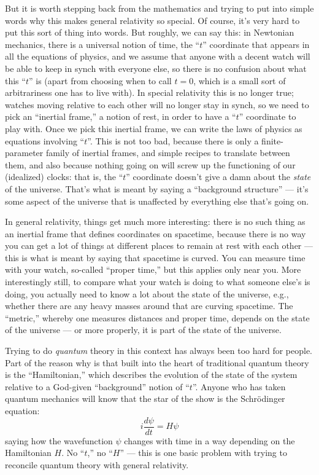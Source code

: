 \documentclass{article}
\begin{document}
But it is worth stepping back from the mathematics and trying to put
into simple words why this makes general relativity so special. Of
course, it's very hard to put this sort of thing into words. But
roughly, we can say this: in Newtonian mechanics, there is a universal
notion of time, the ``\(t\)'' coordinate that appears in all the
equations of physics, and we assume that anyone with a decent watch will
be able to keep in synch with everyone else, so there is no confusion
about what this ``\(t\)'' is (apart from choosing when to call
\(t = 0\), which is a small sort of arbitrariness one has to live with).
In special relativity this is no longer true; watches moving relative to
each other will no longer stay in synch, so we need to pick an
``inertial frame,'' a notion of rest, in order to have a ``\(t\)''
coordinate to play with. Once we pick this inertial frame, we can write
the laws of physics as equations involving ``\(t\)''. This is not too
bad, because there is only a finite-parameter family of inertial frames,
and simple recipes to translate between them, and also because nothing
going on will screw up the functioning of our (idealized) clocks: that
is, the ``\(t\)'' coordinate doesn't give a damn about the \emph{state}
of the universe. That's what is meant by saying a ``background
structure'' --- it's some aspect of the universe that is unaffected by
everything else that's going on.

In general relativity, things get much more interesting: there is no
such thing as an inertial frame that defines coordinates on spacetime,
because there is no way you can get a lot of things at different places
to remain at rest with each other --- this is what is meant by saying
that spacetime is curved. You can measure time with your watch,
so-called ``proper time,'' but this applies only near you. More
interestingly still, to compare what your watch is doing to what someone
else's is doing, you actually need to know a lot about the state of the
universe, e.g., whether there are any heavy masses around that are
curving spacetime. The ``metric,'' whereby one measures distances and
proper time, depends on the state of the universe --- or more properly,
it is part of the state of the universe.

Trying to do \emph{quantum} theory in this context has always been too
hard for people. Part of the reason why is that built into the heart of
traditional quantum theory is the ``Hamiltonian,'' which describes the
evolution of the state of the system relative to a God-given
``background'' notion of ``\(t\)''. Anyone who has taken quantum
mechanics will know that the star of the show is the Schr\"odinger
equation: \[i\frac{d\psi}{dt} = H\psi\] saying how the wavefunction
\(\psi\) changes with time in a way depending on the Hamiltonian \(H\).
No ``\(t\),'' no ``\(H\)'' --- this is one basic problem with trying to
reconcile quantum theory with general relativity.
\end{document}
